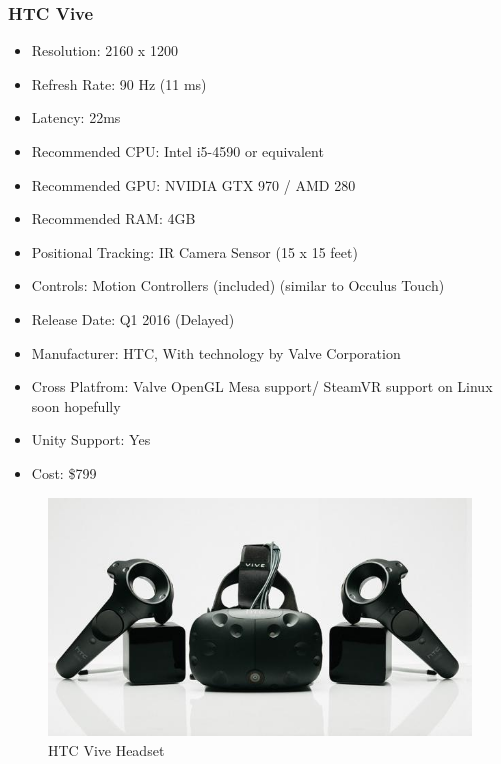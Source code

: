 \documentclass[a4paper,10pt]{article}
\begin{document}
\subsubsection{HTC Vive}
	\begin{itemize}
	  \item Resolution: 2160 x 1200
	  \item Refresh Rate: 90 Hz (11 ms)
	  \item Latency: 22ms
	  \item Recommended CPU: Intel i5-4590 or equivalent
	  \item Recommended GPU: NVIDIA GTX 970 / AMD 280 
	  \item Recommended RAM: 4GB
	  \item Positional Tracking: IR Camera Sensor (15 x 15 feet)
	  \item Controls: Motion Controllers (included) (similar to Occulus Touch)  
	  \item Release Date: Q1 2016 (Delayed)
	  \item Manufacturer: HTC, With technology by Valve Corporation
	  \item Cross Platfrom: Valve OpenGL Mesa support/ SteamVR support on Linux soon hopefully
	  \item Unity Support: Yes
	  \item Cost: \$799
	\end{itemize}
	\begin{figure}[H]
	\includegraphics[width=\linewidth,height=\paperheight,keepaspectratio]{vive.jpg}
	\caption{HTC Vive Headset}
	\label{fig:ViveImg}
	\end{figure}
	\pagebreak
\end{document}
